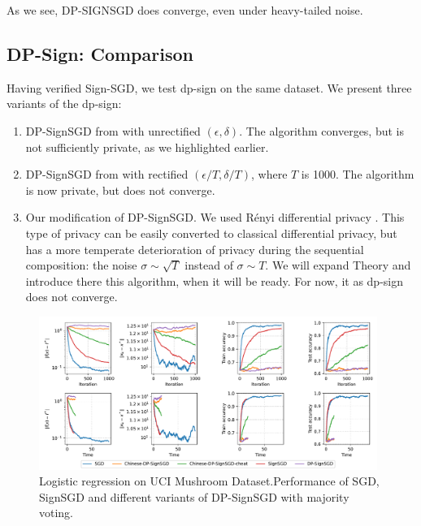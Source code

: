 \documentclass[12pt]{article}
\begin{document}
As we see, {\scriptsize DP-SIGN}SGD does converge, even under heavy-tailed noise.

\subsection{DP-Sign: Comparison}
Having verified Sign-SGD, we test dp-sign on the same dataset. We present three variants of the dp-sign:
\begin{enumerate}
    \item DP-SignSGD from \cite{Jin2020} with unrectified $(\epsilon, \delta)$. The algorithm converges, but is not sufficiently private, as we highlighted earlier.
    \item DP-SignSGD from \cite{Jin2020} with rectified $(\epsilon / T, \delta /T)$, where $T$ is 1000. The algorithm is now private, but does not converge.
    \item Our modification of DP-SignSGD. We used Rényi differential privacy \cite{Dwork2014}. This type of privacy can be easily converted to classical differential privacy, but has a more temperate deterioration of privacy during the sequential composition: the noise $\sigma \sim \sqrt{T}$ instead of $\sigma \sim T$. We will expand Theory and introduce there this algorithm, when it will be ready. For now, it as dp-sign does not converge.
\end{enumerate}
\begin{figure}[h]
    \centering
    \includegraphics[width=0.98\textwidth]{../figs/dps_diverge.pdf}
    \caption{Logistic regression on UCI Mushroom Dataset.\newline Performance of SGD, SignSGD and different variants of DP-SignSGD with majority voting.}
    \label{fig:dp-diverges}
\end{figure}
\end{document}
